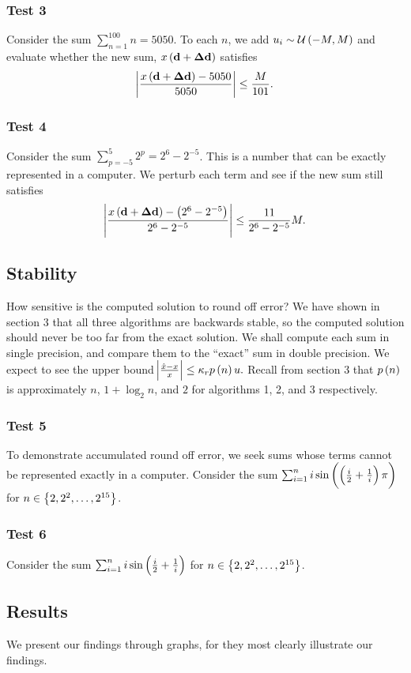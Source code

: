\documentclass[12pt]{article}
\theoremstyle{definition}
\begin{document}
\subsubsection{Test 3}
Consider the sum $\sum_{n=1}^{100}n = 5050$. To each $n$, we add $u_i \sim \mathcal{U}\del{-M,M}$ and evaluate whether the new sum, $x\del{\mathbf{d+\Delta d}}$ satisfies
$$
\abs{\frac{x\del{\mathbf{d+\Delta d}}-5050}{5050}} \leq \frac{M}{101}.
$$

\subsubsection{Test 4}
Consider the sum $\sum_{p=-5}^5 2^p= 2^6 - 2^{-5}$. This is a number that can be exactly represented in a computer. We perturb each term and see if the new sum still satisfies
$$
\abs{\frac{x\del{\mathbf{d+\Delta d}} - \del{2^6 - 2^{-5}}}{2^6 - 2^{-5}}} \leq \frac{11}{2^6 - 2^{-5}}M.
$$
\subsection{Stability}
How sensitive is the computed solution to round off error? We have shown in section 3 that all three algorithms are backwards stable, so the computed solution should never be too far from the exact solution. We shall compute each sum in single precision, and compare them to the ``exact'' sum in double precision. We expect to see the upper bound
$
\abs{\frac{\hat{x}-x}{x}} \leq \kappa_r p\del{n} u.
$
Recall from section 3 that $p\del{n}$ is approximately $n$, $1 + \log_2 n$, and $2$ for algorithms 1, 2, and 3 respectively. 

\subsubsection{Test 5}
To demonstrate accumulated round off error, we seek sums whose terms cannot be represented exactly in a computer. Consider the sum
$
\sum_{i=1}^n i \sin\del{\del{\frac{i}{2}+\frac{1}{i}}\pi}
$
for $n \in \cbr{2,2^2,\dots,2^{15}}$.

\subsubsection{Test 6}
Consider the sum
$
\sum_{i=1}^n i \sin\del{\frac{i}{2}+\frac{1}{i}}
$
for $n \in \cbr{2,2^2,\dots,2^{15}}$.

\subsection{Results}
We present our findings through graphs, for they most clearly illustrate our findings.
\end{document}
